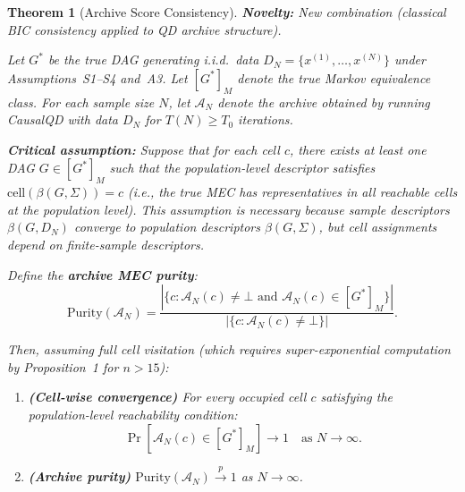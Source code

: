 \documentclass{article}
\theoremstyle{definition}
\theoremstyle{plain}
\newtheorem{theorem}{Theorem}
\theoremstyle{remark}
\begin{document}
\begin{theorem}[Archive Score Consistency]
\label{thm:score_consistency}
\textbf{Novelty:} New combination (classical BIC consistency applied to QD archive structure).

Let $G^*$ be the true DAG generating i.i.d.\ data $D_N = \{x^{(1)}, \ldots,
x^{(N)}\}$ under Assumptions~S1--S4 and~A3. Let $[G^*]_M$ denote the true
Markov equivalence class. For each sample size $N$, let
$\mathcal{A}_N$ denote the archive obtained by running CausalQD with data $D_N$
for $T(N) \geq T_0$ iterations.

\textbf{Critical assumption:} Suppose that for each cell $c$, there exists at least
one DAG $G \in [G^*]_M$ such that the \emph{population-level} descriptor satisfies
$\text{cell}(\beta(G, \Sigma)) = c$ (i.e., the true MEC has representatives in all
reachable cells at the population level). This assumption is necessary because sample
descriptors $\beta(G, D_N)$ converge to population descriptors $\beta(G, \Sigma)$,
but cell assignments depend on finite-sample descriptors.

Define the \textbf{archive MEC purity}:
\begin{equation}
\mathrm{Purity}(\mathcal{A}_N) = \frac{|\{c : \mathcal{A}_N(c) \neq \bot
\text{ and } \mathcal{A}_N(c) \in [G^*]_M\}|}{|\{c : \mathcal{A}_N(c) \neq
\bot\}|}.
\end{equation}

Then, assuming full cell visitation (which requires super-exponential computation
by Proposition~1 for $n > 15$):
\begin{enumerate}
  \item[(a)] \textbf{(Cell-wise convergence)} For every occupied cell $c$ satisfying
    the population-level reachability condition:
    \begin{equation}
      \Pr\!\left[\mathcal{A}_N(c) \in [G^*]_M\right] \to 1
      \quad \text{as } N \to \infty.
    \end{equation}
  \item[(b)] \textbf{(Archive purity)} $\mathrm{Purity}(\mathcal{A}_N)
    \xrightarrow{p} 1$ as $N \to \infty$.
\end{enumerate}
\end{theorem}
\end{document}
